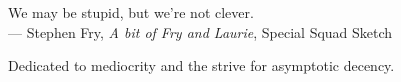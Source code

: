 \thispagestyle{empty}
{}

\vspace*{3cm}

\begin{center}
    We may be stupid, but we're not clever. \\ \medskip
    --- Stephen Fry, \emph{A bit of Fry and Laurie}, Special Squad Sketch
\end{center}

\medskip

\begin{center}
    Dedicated to mediocrity and the strive for asymptotic decency. \\ \smallskip
\end{center}